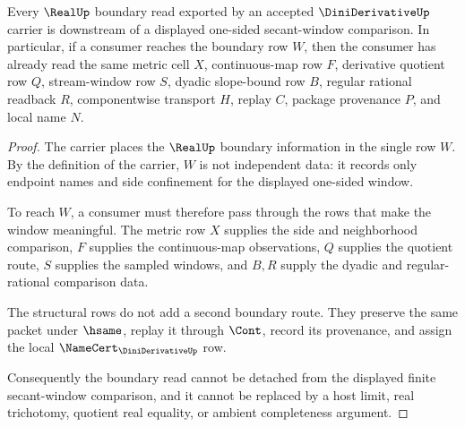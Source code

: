 \begin{theorem}
\label{thm:dini-derivative-real-boundary}
Every $\RealUp$ boundary read exported by an accepted $\DiniDerivativeUp$ carrier is downstream of a displayed one-sided secant-window comparison. In particular, if a consumer reaches the boundary row $W$, then the consumer has already read the same metric cell $X$, continuous-map row $F$, derivative quotient row $Q$, stream-window row $S$, dyadic slope-bound row $B$, regular rational readback $R$, componentwise transport $H$, replay $C$, package provenance $P$, and local name $N$.
\end{theorem}
\begin{proof}
The carrier places the $\RealUp$ boundary information in the single row $W$. By the definition of the carrier, $W$ is not independent data: it records only endpoint names and side confinement for the displayed one-sided window.

To reach $W$, a consumer must therefore pass through the rows that make the window meaningful. The metric row $X$ supplies the side and neighborhood comparison, $F$ supplies the continuous-map observations, $Q$ supplies the quotient route, $S$ supplies the sampled windows, and $B,R$ supply the dyadic and regular-rational comparison data.

The structural rows do not add a second boundary route. They preserve the same packet under $\hsame$, replay it through $\Cont$, record its provenance, and assign the local $\NameCert_{\DiniDerivativeUp}$ row.

Consequently the boundary read cannot be detached from the displayed finite secant-window comparison, and it cannot be replaced by a host limit, real trichotomy, quotient real equality, or ambient completeness argument.
\end{proof}



